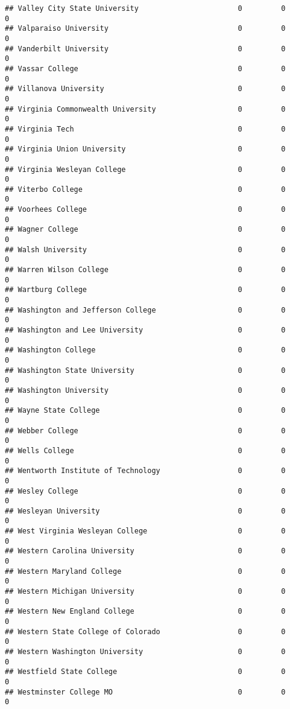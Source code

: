 \documentclass[
]{article}
\begin{document}
\begin{verbatim}
## Valley City State University                       0         0         0
## Valparaiso University                              0         0         0
## Vanderbilt University                              0         0         0
## Vassar College                                     0         0         0
## Villanova University                               0         0         0
## Virginia Commonwealth University                   0         0         0
## Virginia Tech                                      0         0         0
## Virginia Union University                          0         0         0
## Virginia Wesleyan College                          0         0         0
## Viterbo College                                    0         0         0
## Voorhees College                                   0         0         0
## Wagner College                                     0         0         0
## Walsh University                                   0         0         0
## Warren Wilson College                              0         0         0
## Wartburg College                                   0         0         0
## Washington and Jefferson College                   0         0         0
## Washington and Lee University                      0         0         0
## Washington College                                 0         0         0
## Washington State University                        0         0         0
## Washington University                              0         0         0
## Wayne State College                                0         0         0
## Webber College                                     0         0         0
## Wells College                                      0         0         0
## Wentworth Institute of Technology                  0         0         0
## Wesley College                                     0         0         0
## Wesleyan University                                0         0         0
## West Virginia Wesleyan College                     0         0         0
## Western Carolina University                        0         0         0
## Western Maryland College                           0         0         0
## Western Michigan University                        0         0         0
## Western New England College                        0         0         0
## Western State College of Colorado                  0         0         0
## Western Washington University                      0         0         0
## Westfield State College                            0         0         0
## Westminster College MO                             0         0         0

\end{verbatim}
\end{document}
